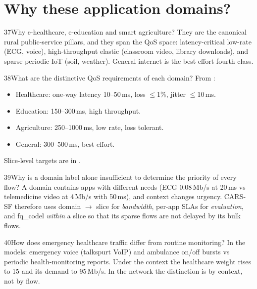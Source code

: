 \section{Why these application domains?}

\begin{qa}{37}{Why e-healthcare, e-education and smart agriculture?}
They are the canonical rural public-service pillars, and they span the QoS space: latency-critical low-rate
(ECG, voice), high-throughput elastic (classroom video, library downloads), and sparse periodic IoT (soil, weather).
General internet is the best-effort fourth class.
\end{qa}

\begin{qa}{38}{What are the distinctive QoS requirements of each domain?}
From :
\begin{itemize}
\item Healthcare: one-way latency 10--50\,ms, loss $\le$1\%, jitter $\le$10\,ms.
\item Education: 150--300\,ms, high throughput.
\item Agriculture: 250--1000\,ms, low rate, loss tolerant.
\item General: 300--500\,ms, best effort.
\end{itemize}
Slice-level targets are in .
\end{qa}

\begin{qa}{39}{Why is a domain label alone insufficient to determine the priority of every flow?}
A domain contains apps with different needs (ECG 0.08\,Mb/s at 20\,ms vs telemedicine video at 4\,Mb/s with 50\,ms),
and context changes urgency. CARS-SF therefore uses domain $\to$ slice for \emph{bandwidth}, per-app SLAs for
\emph{evaluation}, and fq\_codel \emph{within} a slice so that its sparse flows are not delayed by its bulk flows.
\end{qa}

\begin{qa}{40}{How does emergency healthcare traffic differ from routine monitoring?}
In the models: emergency voice (talkspurt VoIP) and ambulance on/off bursts vs periodic health-monitoring reports.
Under the  context the healthcare weight rises to 15 and its demand to 95\,Mb/s.
In the network the distinction is by context, not by flow.
\end{qa}

